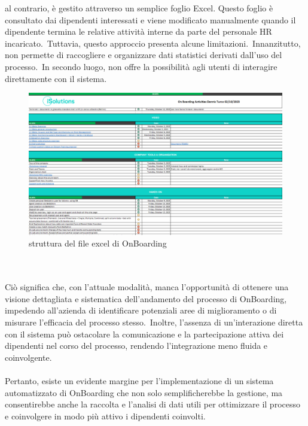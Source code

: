 al contrario, è gestito attraverso un semplice foglio Excel. Questo foglio è consultato dai dipendenti interessati 
e viene modificato manualmente quando il dipendente termina le relative attività interne da parte del personale HR incaricato.\ 
Tuttavia, questo approccio presenta alcune limitazioni.\ 
Innanzitutto, non permette di raccogliere e organizzare dati statistici derivati dall'uso del processo.\ 
In secondo luogo, non offre la possibilità agli utenti di interagire direttamente con il sistema.
\begin{figure}[ht]
	\centering
	\includegraphics[width=\textwidth]{img/OnBoardingExcel.png}
	\caption{struttura del file excel di OnBoarding}
	\label{fig:OnBoardingExcel}
\end{figure}
\\ \\
Ciò significa che, con l'attuale modalità, manca l'opportunità di ottenere una visione dettagliata e sistematica dell'andamento del processo di OnBoarding, 
impedendo all'azienda di identificare potenziali aree di miglioramento o di misurare l'efficacia del processo stesso.\ 
Inoltre, l'assenza di un'interazione diretta con il sistema può ostacolare la comunicazione e la partecipazione attiva dei dipendenti nel corso 
del processo, rendendo l'integrazione meno fluida e coinvolgente.
\\ \\
Pertanto, esiste un evidente margine per l'implementazione di un sistema automatizzato di OnBoarding che non solo semplificherebbe 
la gestione, ma consentirebbe anche la raccolta e l'analisi di dati utili per ottimizzare il processo e coinvolgere in modo più 
attivo i dipendenti coinvolti.
